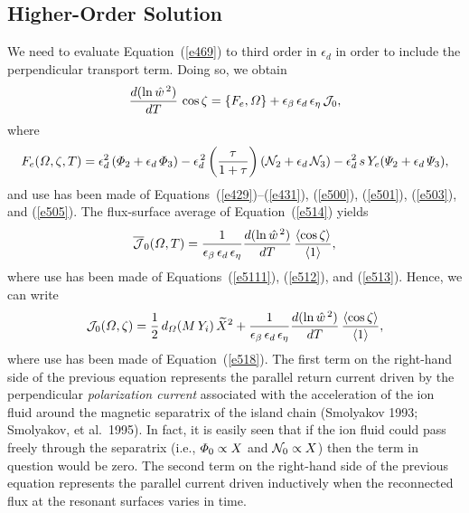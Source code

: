 \documentclass[notitlepage,12pt]{article}
\begin{document}
\subsection{Higher-Order Solution}
We need to evaluate Equation~(\ref{e469}) to third order in $\epsilon_d$ in order to include the perpendicular transport term. Doing so,
we obtain
\begin{equation}\label{e514}
\frac{d(\ln \hat{w}^{\,2})}{dT}\,\cos\zeta = \{F_e, {\mit\Omega}\} + \epsilon_\beta\,\epsilon_d\,\epsilon_\eta\,{\cal J}_0,
\end{equation}
where
\begin{equation}
F_e({\mit\Omega},\zeta,T)= \epsilon_d^2\,({\mit\Phi}_2+\epsilon_d\,{\mit\Phi}_3)-\epsilon_d^{\,2}\left(\frac{\tau}{1+\tau}\right)({\cal N}_2+\epsilon_d\,{\cal N}_3)
- \epsilon_d^2\,s\,Y_e({\mit\Psi}_2+\epsilon_d\,{\mit\Psi}_3),
\end{equation}
and use has been made of Equations~(\ref{e429})--(\ref{e431}), (\ref{e500}), (\ref{e501}), (\ref{e503}), and (\ref{e505}). 
The flux-surface average of Equation~(\ref{e514}) yields
\begin{equation}
\overline{\cal J}_0({\mit\Omega},T) = \frac{1}{\epsilon_\beta\,\epsilon_d\,\epsilon_\eta}\frac{d(\ln \hat{w}^{\,2})}{dT}\,\frac{\langle\cos\zeta\rangle}{\langle 1\rangle},
\end{equation}
where use has been made of Equations~(\ref{e5111}), (\ref{e512}), and (\ref{e513}). Hence, we
can write
\begin{equation}\label{e524a}
{\cal J}_0({\mit\Omega},\zeta)= 
\frac{1}{2}\,d_{\mit\Omega}\!\left(M\,Y_i\right)\widetilde{X}^2+ \frac{1}{\epsilon_\beta\,\epsilon_d\,\epsilon_\eta}\frac{d(\ln \hat{w}^{\,2})}{dT}\,\frac{\langle\cos\zeta\rangle}{\langle 1\rangle},
\end{equation}
where use has been made of Equation~(\ref{e518}). 
The first term on the right-hand side of the previous equation represents the parallel return current driven by the perpendicular {\em polarization current}\/ associated with the
acceleration of the ion fluid around the magnetic separatrix of the island chain (Smolyakov 1993; Smolyakov, et al.\ 1995). 
In fact, it is easily seen that if the ion fluid could pass freely through the separatrix (i.e., ${\mit\Phi}_0\propto X$ and ${\cal N}_0\propto X$) then the term in question would be zero. The second term on the right-hand side of the previous equation represents the parallel current driven
inductively when the reconnected flux at the resonant surfaces varies in time. 
\end{document}
